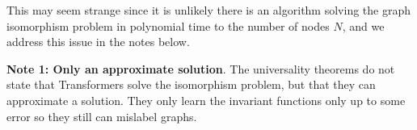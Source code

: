 \documentclass{article}
\newcommand{\xhdr}[1]{{\noindent\bfseries #1}.}
\begin{document}

This may seem strange since it is unlikely there is an algorithm solving the graph isomorphism problem in polynomial time to the number of nodes $N$, and we address this issue in the notes below.

\xhdr{Note 1: Only an approximate solution}
The universality theorems do not state that Transformers solve the isomorphism problem, but that they can approximate a solution. They only learn the invariant functions only up to some error so they still can mislabel graphs.
\end{document}
